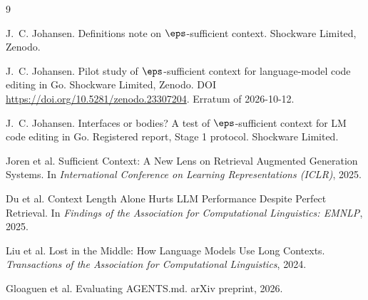\begin{thebibliography}{9}

J.~C. Johansen.
Definitions note on $\eps$-sufficient context.
Shockware Limited, Zenodo.

J.~C. Johansen.
Pilot study of $\eps$-sufficient context for language-model code editing in Go.
Shockware Limited, Zenodo.
DOI \url{https://doi.org/10.5281/zenodo.23307204}.
Erratum of 2026-10-12.

J.~C. Johansen.
Interfaces or bodies? A test of $\eps$-sufficient context for LM code editing in Go.
Registered report, Stage 1 protocol. Shockware Limited.

Joren et al.
Sufficient Context: A New Lens on Retrieval Augmented Generation Systems.
In \emph{International Conference on Learning Representations (ICLR)}, 2025.

Du et al.
Context Length Alone Hurts LLM Performance Despite Perfect Retrieval.
In \emph{Findings of the Association for Computational Linguistics: EMNLP}, 2025.

Liu et al.
Lost in the Middle: How Language Models Use Long Contexts.
\emph{Transactions of the Association for Computational Linguistics}, 2024.

Gloaguen et al.
Evaluating AGENTS.md.
arXiv preprint, 2026.

\end{thebibliography}
